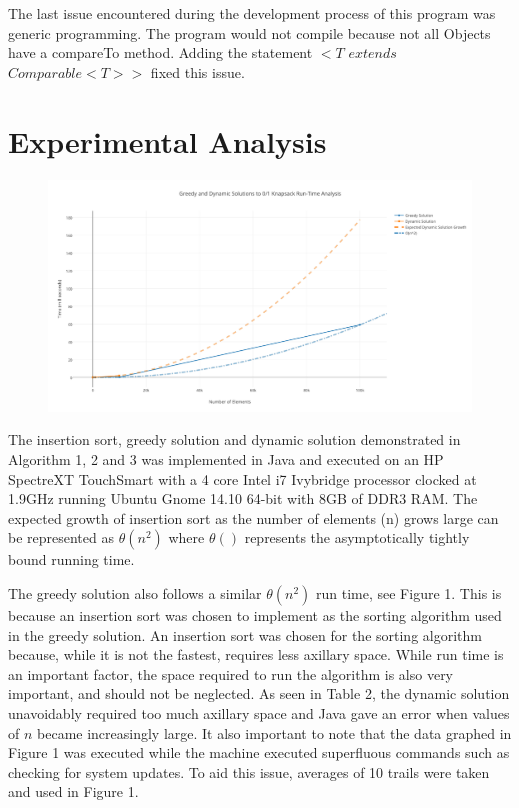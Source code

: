 \documentclass[onecolumn, 12pt, article]{IEEEtran}
\numberwithin{case}{problem}
\numberwithin{condition}{problem}
\numberwithin{condition}{subsection}
\numberwithin{definition}{section}
\theoremstyle{remark}
\numberwithin{question}{problem}
\theoremstyle{plain}
\numberwithin{answer}{problem}
\numberwithin{solution}{section}
\numberwithin{equation}{section}%
\begin{document}
The last issue encountered during the development process of this program was generic programming. The program would not compile because not all Objects have a compareTo method. Adding the statement $<T$ $extends$ $Comparable<T>>$ fixed this issue. \cite{erik}


\section{Experimental Analysis}
\begin{figure}[!]
\begin{center}
\includegraphics[scale=.55]{test-results.pdf}
\end{center}
\label{fig:runtime}
\end{figure}
The insertion sort, greedy solution and dynamic solution demonstrated in Algorithm 1, 2 and 3 was implemented in Java and executed on an HP SpectreXT TouchSmart with a 4 core Intel i7 Ivybridge processor clocked at 1.9GHz running Ubuntu Gnome 14.10 64-bit with 8GB of DDR3 RAM.
The expected growth of insertion sort as the number of elements (n) grows large can be represented as $ \theta(n^2) $ where $ \theta() $ represents the asymptotically tightly bound running time. \cite{textbook}

The greedy solution also follows a similar $ \theta(n^2) $ run time, see Figure 1. This is because an insertion sort was chosen to implement as the sorting algorithm used in the greedy solution. An insertion sort was chosen for the sorting algorithm because, while it is not the fastest, requires less axillary space. While run time is an important factor, the space required to run the algorithm is also very important, and should not be neglected. As seen in Table 2, the dynamic solution unavoidably required too much axillary space and Java gave an error when values of $n$ became increasingly large. It also important to note that the data graphed in Figure 1 was executed while the machine executed superfluous commands such as checking for system updates. To aid this issue, averages of 10 trails were taken and used in Figure 1.
\end{document}

